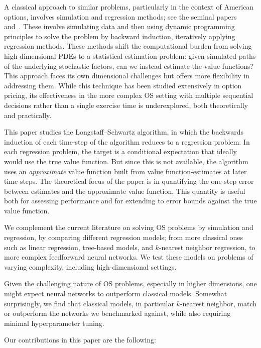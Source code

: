 \documentclass[11pt,reqno,a4paper]{amsart}
\theoremstyle{definition}
\numberwithin{equation}{section}
\DeclareMathOperator{\1}{\mathbbm{1}}
\begin{document}
A classical approach to similar problems, particularly in the context of American options, involves simulation and regression methods; see the seminal papers~\cite{LS01} and~\cite{TVR99}. These involve simulating data and then using dynamic programming principles to solve the problem by backward induction, iteratively applying regression methods. These methods shift the computational burden from solving high-dimensional PDEs to a statistical estimation problem: given simulated paths of the underlying stochastic factors, can we instead estimate the value functions? This approach faces its own dimensional challenges but offers more flexibility in addressing them. While this technique has been studied extensively in option pricing, its effectiveness in the more complex OS setting with multiple sequential decisions rather than a single exercise time is underexplored, both theoretically and practically.

This paper studies the Longstaff–Schwartz algorithm, in which the backwards induction of each time-step of the algorithm reduces to a regression problem. In each regression problem, the target is a conditional expectation that ideally would use the true value function. But since this is not available, the algorithm uses an \emph{approximate} value function built from value function-estimates at later time-steps. The theoretical focus of the paper is in quantifying the one-step error between estimates and the approximate value function. This quantity is useful both for assessing performance and for extending to error bounds against the true value function.

We complement the current literature on solving OS problems by simulation and regression, by comparing different regression models; from more classical ones such as linear regression, tree-based models, and $k$-nearest neighbor regression, to more complex feedforward neural networks. We test these models on problems of varying complexity, including high-dimensional settings.

Given the challenging nature of OS problems, especially in higher dimensions, one might expect neural networks to outperform classical models. Somewhat surprisingly, we find that classical models, in particular $k$-nearest neighbor, match or outperform the networks we benchmarked against, while also requiring minimal hyperparameter tuning.



Our contributions in this paper are the following:
\end{document}
